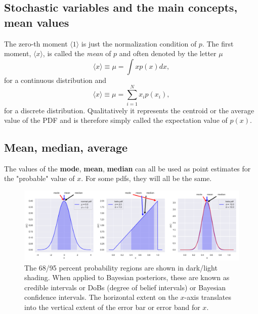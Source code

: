 \documentclass[%
oneside,                 %
final,                   %
10pt]{article}
\newenvironment{block_mdfboxadmon}[1][]{
\begin{block_mdfboxmdframed}[frametitle=#1]
}
{
\end{block_mdfboxmdframed}
}
\begin{document}
\subsection{Stochastic variables and the main concepts, mean values}

\begin{block_mdfboxadmon}[]
The zero-th moment $\langle 1\rangle$ is just the normalization condition of
$p$. The first moment, $\langle x\rangle$, is called the \emph{mean} of $p$
and often denoted by the letter $\mu$
\begin{equation*}
\langle x\rangle  \equiv \mu = \int x p(x)dx,
\end{equation*}
for a continuous distribution and 
\begin{equation*}
\langle x\rangle  \equiv \mu = \sum_{i=1}^N x_i p(x_i),
\end{equation*}
for a discrete distribution. 
Qualitatively it represents the centroid or the average value of the
PDF and is therefore simply called the expectation value of $p(x)$.
\end{block_mdfboxadmon} %



\subsection{Mean, median, average}

\begin{block_mdfboxadmon}[]
The values of the \textbf{mode}, \textbf{mean}, \textbf{median} can all be used as point estimates for the "probable" value of $x$. For some pdfs, they will all be the same.
\end{block_mdfboxadmon} %




\begin{figure}[!ht]  %
  \centerline{\includegraphics[width=1.0\linewidth]{fig/pdfs.png}}
  \caption{
  The 68/95 percent probability regions are shown in dark/light shading. When applied to Bayesian posteriors, these are known as credible intervals or DoBs (degree of belief intervals) or Bayesian confidence intervals. The horizontal extent on the $x$-axis translates into the vertical extent of the error bar or error band for $x$.
  }
\end{figure}
\end{document}
